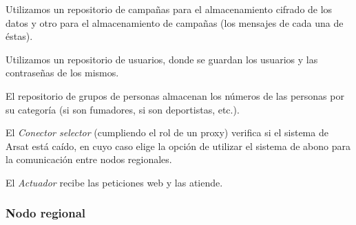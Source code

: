 \documentclass[a4paper, 10pt, twoside]{article}
\begin{document}
Utilizamos un repositorio de campañas para el almacenamiento cifrado de los datos y otro para el almacenamiento de campañas (los mensajes de cada una de éstas).

Utilizamos un repositorio de usuarios, donde se guardan los usuarios y las contraseñas de los mismos.

El repositorio de grupos de personas almacenan los números de las personas por su categoría (si son fumadores, si son deportistas, etc.).



El \textit{Conector selector} (cumpliendo el rol de un proxy) verifica si el sistema de Arsat está caído, en cuyo caso elige la opción de utilizar el sistema de abono para la comunicación entre nodos regionales.

El \textit{Actuador} recibe las peticiones web y las atiende.



\subsubsection{Nodo regional}
\end{document}
